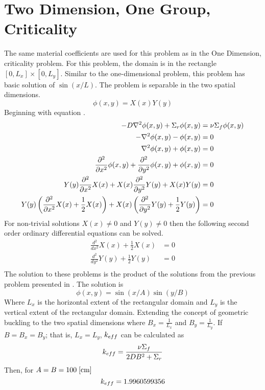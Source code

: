 \section{Two Dimension, One Group, Criticality}
  \label{sec:deriv_2d1g}
  The same material coefficients are used for this problem as in the 
  One Dimension, criticality problem. For this problem, the domain is in the 
  rectangle $[0,L_x]\times[0,L_y]$. Similar to the one-dimensional problem, 
  this problem has basic solution of $\sin(x/L)$. The problem is separable in 
  the two spatial dimensions. 
  \begin{equation}
    \phi(x,y) = X(x) Y(y) 
  \end{equation}
  Beginning with equation .
  \begin{align}
    -D \mathbf{\nabla}^2 \phi(x,y) + \Sigma_r \phi(x,y) &= \nu \Sigma_f \phi(x,y) \\
    - \mathbf{\nabla}^2 \phi(x,y) - \phi(x,y) &= 0 \\
    \mathbf{\nabla}^2 \phi(x,y) + \phi(x,y) &= 0 \\
    \frac{\partial^2}{\partial x^2} \phi(x,y) + 
      \frac{\partial^2}{\partial y^2} \phi(x,y) +
      \phi(x,y) &= 0\\
    Y(y)\frac{\partial^2}{\partial x^2}X(x) +
      X(x) \frac{\partial^2}{\partial y^2} Y(y) + X(x)Y(y) &= 0\\
    Y(y)\left(\frac{\partial^2}{\partial x^2}X(x) + \frac{1}{2} X(x)\right)+
      X(x)\left(\frac{\partial^2}{\partial y^2}Y(y) + \frac{1}{2}Y(y)
      \right) &= 0
  \end{align}
  For non-trivial solutions $X(x) \ne 0$ and $Y(y) \ne 0$ then the following
  second order ordinary differential equations can be solved.
  \begin{align}
    \frac{d^2}{dx^2} X(x) + \frac{1}{2} X(x) &= 0 \\
    \frac{d^2}{dy^2} Y(y) + \frac{1}{2} Y(y) &= 0 \\
  \end{align}
  The solution to these problems is the product of the solutions from the 
  previous problem presented in . The solution is
  \begin{equation} \label{eq:analytic_2d1g}
    \phi(x,y) = \sin(x/A) \sin(y/B)
  \end{equation}
  Where $L_x$ is the horizontal extent of the rectangular domain and $L_y$ is 
  the vertical extent of the rectangular domain. Extending the concept of 
  geometric buckling to the two spatial dimensions where $B_x = \frac{1}{L_x}$
  and $B_y = \frac{1}{L_y}$. If $B=B_x=B_y$; that is, $L_x=L_y$, $k_{eff}$ can 
  be calculated as
  \begin{equation}
    k_{eff} = \frac{\nu \Sigma_f}{2DB^2 + \Sigma_r} 
  \end{equation}
  Then, for $A=B = 100 \;\text{[{cm}]}$
  \begin{equation}
    k_{eff} = 1.9960599356
  \end{equation}
  
